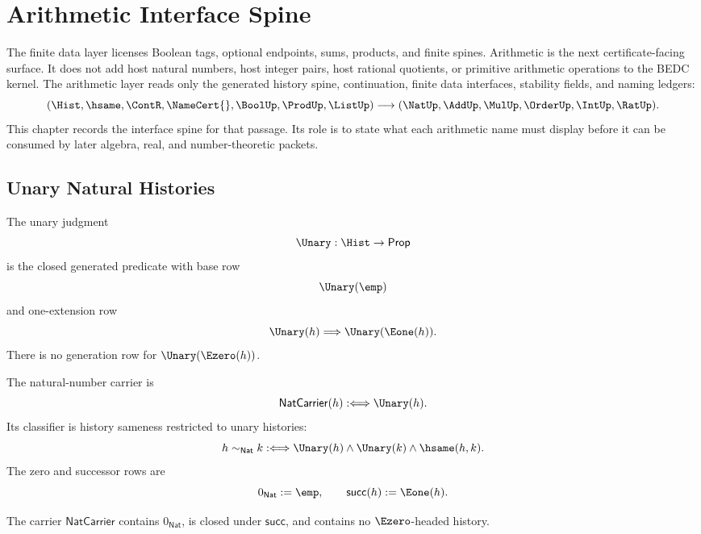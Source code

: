 \chapter{Arithmetic Interface Spine}
\label{ch:visions-arithmetic-interface-spine}

The finite data layer licenses Boolean tags, optional endpoints, sums,
products, and finite spines.  Arithmetic is the next certificate-facing
surface.  It does not add host natural numbers, host integer pairs, host
rational quotients, or primitive arithmetic operations to the BEDC kernel.
The arithmetic layer reads only the generated history spine, continuation,
finite data interfaces, stability fields, and naming ledgers:
$$
(\Hist,\hsame,\ContR,\NameCert{},\BoolUp,\ProdUp,\ListUp)
\longrightarrow
(\NatUp,\AddUp,\MulUp,\OrderUp,\IntUp,\RatUp).
$$
This chapter records the interface spine for that passage.  Its role is to
state what each arithmetic name must display before it can be consumed by
later algebra, real, and number-theoretic packets.

\section{Unary Natural Histories}
\label{sec:arithmetic-spine-nat}

\begin{definition}
\label{def:arithmetic-spine-unary-history}
The unary judgment
$$
\Unary:\Hist\to\mathsf{Prop}
$$
is the closed generated predicate with base row
$$
\Unary(\emp)
$$
and one-extension row
$$
\Unary(h)\Longrightarrow\Unary(\Eone(h)).
$$
There is no generation row for $\Unary(\Ezero(h))$.
\end{definition}

\begin{definition}
\label{def:arithmetic-spine-nat-carrier-classifier}
The natural-number carrier is
$$
\mathsf{NatCarrier}(h):\Longleftrightarrow \Unary(h).
$$
Its classifier is history sameness restricted to unary histories:
$$
h\sim_{\mathsf{Nat}}k
:\Longleftrightarrow
\Unary(h)\wedge\Unary(k)\wedge\hsame(h,k).
$$
The zero and successor rows are
$$
0_{\mathsf{Nat}}:=\emp,
\qquad
\mathsf{succ}(h):=\Eone(h).
$$
\end{definition}

\begin{theorem}
\label{thm:arithmetic-spine-unary-closure-zero-separation}
The carrier $\mathsf{NatCarrier}$ contains $0_{\mathsf{Nat}}$, is closed
under $\mathsf{succ}$, and contains no $\Ezero$-headed history.
\end{theorem}

